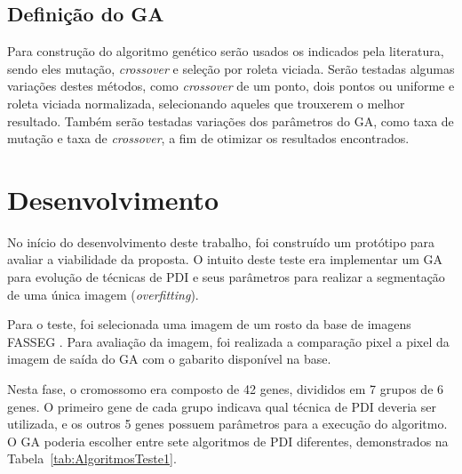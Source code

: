 \documentclass[12pt,oneside,a4paper,english,french,spanish,brazil,]{abntex2}
\begin{document}
\section{Definição do GA}

Para construção do algoritmo genético serão usados os indicados pela literatura, sendo eles mutação, \textit{crossover} e seleção por roleta viciada. Serão testadas algumas variações destes métodos, como \textit{crossover} de um ponto, dois pontos ou uniforme e roleta viciada normalizada, selecionando aqueles que trouxerem o melhor resultado. Também serão testadas variações dos parâmetros do GA, como taxa de mutação e taxa de \textit{crossover}, a fim de otimizar os resultados encontrados.

\chapter{Desenvolvimento}

No início do desenvolvimento deste trabalho, foi construído um protótipo para avaliar a viabilidade da proposta. O intuito deste teste era implementar um GA para evolução de técnicas de PDI e seus parâmetros para realizar a segmentação de uma única imagem (\textit{overfitting}).

Para o teste, foi selecionada uma imagem de um rosto da base de imagens FASSEG \cite{fasseg:2018}. Para avaliação da imagem, foi realizada a comparação pixel a pixel da imagem de saída do GA com o gabarito disponível na base.

Nesta fase, o cromossomo era composto de 42 genes, divididos em 7 grupos de 6 genes. O primeiro gene de cada grupo indicava qual técnica de PDI deveria ser utilizada, e os outros 5 genes possuem parâmetros para a execução do algoritmo. O GA poderia escolher entre sete algoritmos de PDI diferentes, demonstrados na Tabela~\ref{tab:AlgoritmosTeste1}.
\end{document}
